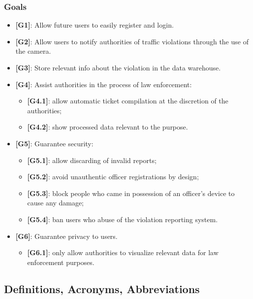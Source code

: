 \documentclass[12pt,a4paper]{article}
\begin{document}
\subsubsection{Goals}
\begin{itemize}
\item {\textbf[}\textbf{G1}{\textbf]}: Allow future users to easily register and login. 
\item {\textbf[}\textbf{G2}{\textbf]}: Allow users to notify authorities of traffic violations through the use of the camera.
\item {\textbf[}\textbf{G3}{\textbf]}: Store relevant info about the violation in the data warehouse.
\item {\textbf[}\textbf{G4}{\textbf]}: Assist authorities in the process of law enforcement:
\begin{itemize}
	 \item {\textbf[}\textbf{G4.1}{\textbf]}: allow automatic ticket compilation at the discretion of the authorities;
	\item {\textbf[}\textbf{G4.2}{\textbf]}: show processed data relevant to the purpose.
\end{itemize}
\item {\textbf[}\textbf{G5}{\textbf]}: Guarantee security: 
\begin{itemize}
	\item {\textbf[}\textbf{G5.1}{\textbf]}: allow discarding of invalid reports;
	\item {\textbf[}\textbf{G5.2}{\textbf]}: avoid unauthentic officer registrations by design;
	\item {\textbf[}\textbf{G5.3}{\textbf]}: block people who came in possession of an officer's device to cause any damage;
	\item {\textbf[}\textbf{G5.4}{\textbf]}: ban users who abuse of the violation reporting system.
\end{itemize}
\item {\textbf[}\textbf{G6}{\textbf]}: Guarantee privacy to users.
	\begin{itemize}
	\item {\textbf[}\textbf{G6.1}{\textbf]}: only allow authorities to visualize relevant data for law enforcement purposes.
	\end{itemize}
\end{itemize}
\subsection{Definitions, Acronyms, Abbreviations} 
\end{document}
